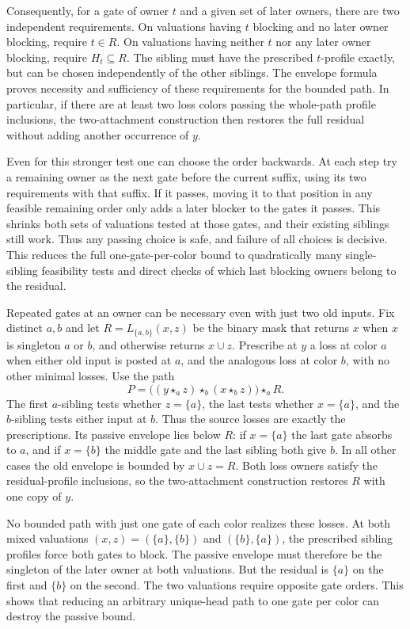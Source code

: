 Consequently, for a gate of owner $t$ and a given set of
later owners, there are two independent requirements. On
valuations having $t$ blocking and no later owner blocking,
require $t\in R$. On valuations having neither $t$ nor any
later owner blocking, require $H_t\subseteq R$. The sibling
must have the prescribed $t$-profile exactly, but can be
chosen independently of the other siblings. The envelope
formula proves necessity and sufficiency of these requirements
for the bounded path. In particular, if there are at least
two loss colors passing the whole-path profile inclusions,
the two-attachment construction then restores the full
residual without adding another occurrence of $y$.

Even for this stronger test one can choose the order backwards.
At each step try a remaining owner as the next gate before the
current suffix, using its two requirements with that suffix.
If it passes, moving it to that position in any feasible
remaining order only adds a later blocker to the gates it
passes. This shrinks both sets of valuations tested at those
gates, and their existing siblings still work. Thus any
passing choice is safe, and failure of all choices is decisive.
This reduces the full one-gate-per-color bound to quadratically
many single-sibling feasibility tests and direct checks of
which last blocking owners belong to the residual.

Repeated gates at an owner can be necessary even with just two
old inputs. Fix distinct $a,b$ and let
$R=L_{\{a,b\}}(x,z)$ be the binary mask that returns $x$ when
$x$ is singleton $a$ or $b$, and otherwise returns $x\cup z$.
Prescribe at $y$ a loss at color $a$ when either old input is
posted at $a$, and the analogous loss at color $b$, with no
other minimal losses. Use the path
\[
 P=\bigl((y\star_a z)\star_b(x\star_b z)\bigr)\star_a R.
\]
The first $a$-sibling tests whether $z=\{a\}$, the last
tests whether $x=\{a\}$, and the $b$-sibling tests either
input at $b$. Thus the source losses are exactly the
prescriptions. Its passive envelope lies below $R$: if
$x=\{a\}$ the last gate absorbs to $a$, and if $x=\{b\}$
the middle gate and the last sibling both give $b$. In all
other cases the old envelope is bounded by $x\cup z=R$.
Both loss owners satisfy the residual-profile inclusions, so
the two-attachment construction restores $R$ with one copy
of $y$.

No bounded path with just one gate of each color realizes
these losses. At both mixed valuations $(x,z)=(\{a\},\{b\})$
and $(\{b\},\{a\})$, the prescribed sibling profiles force
both gates to block. The passive envelope must therefore be
the singleton of the later owner at both valuations. But the
residual is $\{a\}$ on the first and $\{b\}$ on the second.
The two valuations require opposite gate orders. This shows
that reducing an arbitrary unique-head path to one gate per
color can destroy the passive bound.

